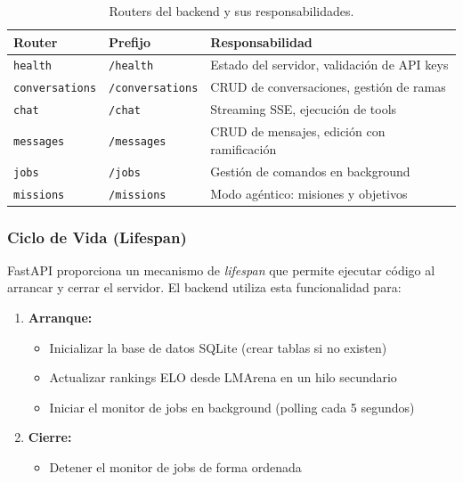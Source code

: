 \begin{table}[H]
\centering
\renewcommand{\arraystretch}{1.2}
\begin{tabular}{|l|l|p{6cm}|}
\hline
\rowcolor[gray]{0.85}
\textbf{Router} & \textbf{Prefijo} & \textbf{Responsabilidad} \\
\hline
\texttt{health} & \texttt{/health} & Estado del servidor, validación de API keys \\
\hline
\texttt{conversations} & \texttt{/conversations} & CRUD de conversaciones, gestión de ramas \\
\hline
\texttt{chat} & \texttt{/chat} & Streaming SSE, ejecución de tools \\
\hline
\texttt{messages} & \texttt{/messages} & CRUD de mensajes, edición con ramificación \\
\hline
\texttt{jobs} & \texttt{/jobs} & Gestión de comandos en background \\
\hline
\texttt{missions} & \texttt{/missions} & Modo agéntico: misiones y objetivos \\
\hline
\end{tabular}
\caption{Routers del backend y sus responsabilidades.}
\label{tab:routers_backend}
\end{table}

\subsubsection{Ciclo de Vida (Lifespan)}

FastAPI proporciona un mecanismo de \textit{lifespan} que permite ejecutar código al arrancar y cerrar el servidor. El backend utiliza esta funcionalidad para:

\begin{enumerate}
    \item \textbf{Arranque:}
    \begin{itemize}
        \item Inicializar la base de datos SQLite (crear tablas si no existen)
        \item Actualizar rankings ELO desde LMArena en un hilo secundario
        \item Iniciar el monitor de jobs en background (polling cada 5 segundos)
    \end{itemize}
    
    \item \textbf{Cierre:}
    \begin{itemize}
        \item Detener el monitor de jobs de forma ordenada
    \end{itemize}
\end{enumerate}

